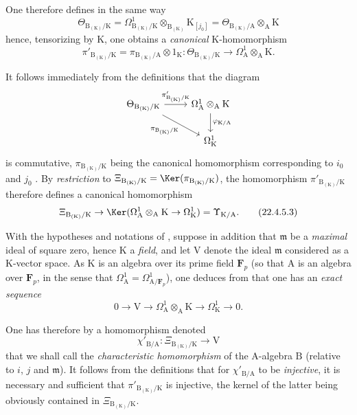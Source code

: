 \begin{env}[22.4.5]
One therefore defines in the same way
\[
  \Theta_{\mathrm{B}_{(\mathrm{K})}/\mathrm{K}}=\Omega^1_{\mathrm{B}_{(\mathrm{K})}/\mathrm{K}}\otimes_{\mathrm{B}_{(\mathrm{K})}}\mathrm{K}_{[j_0]}=\Theta_{\mathrm{B}_{(\mathrm{K})}/\mathrm{A}}\otimes_\mathrm{A}\mathrm{K}
\]
hence, tensorizing  by $\mathrm{K}$, one obtains a \emph{canonical} $\mathrm{K}$-homomorphism
\[
\label{0.22.4.5.2}
  \pi'_{\mathrm{B}_{(\mathrm{K})}/\mathrm{K}}=\pi_{\mathrm{B}_{(\mathrm{K})}/\mathrm{A}}\otimes 1_\mathrm{K}:\Theta_{\mathrm{B}_{(\mathrm{K})}/\mathrm{K}}\to\Omega^1_\mathrm{A}\otimes_\mathrm{A}\mathrm{K}.
  \tag{22.4.5.2}
\]

It follows immediately from the definitions that the diagram
\[
  \begin{tikzcd}
    \Theta_{\mathrm{B}_{(\mathrm{K})}/\mathrm{K}} \ar[r,"\pi'_{\mathrm{B}_{(\mathrm{K})}/\mathrm{K}}"] \ar[dr,"\pi_{\mathrm{B}_{(\mathrm{K})}/\mathrm{K}}",swap] & \Omega^1_\mathrm{A}\otimes_\mathrm{A}\mathrm{K} \ar[d,"\varphi_{\mathrm{K}/\mathrm{A}}"]\\
    & \Omega^1_\mathrm{K}
  \end{tikzcd}
\]
is commutative, $\pi_{\mathrm{B}_{(\mathrm{K})}/\mathrm{K}}$ being the canonical homomorphism corresponding to $i_0$ and $j_0$ .
By \emph{restriction} to $\Xi_{\mathrm{B}_{(\mathrm{K})}/\mathrm{K}}=\Ker(\pi_{\mathrm{B}_{(\mathrm{K})}/\mathrm{K}})$, the homomorphism $\pi'_{\mathrm{B}_{(\mathrm{K})}/\mathrm{K}}$ therefore defines a canonical homomorphism
\[
\label{0.22.4.5.3}
  \Xi_{\mathrm{B}_{(\mathrm{K})}/\mathrm{K}}\to\Ker(\Omega^1_\mathrm{A}\otimes_\mathrm{A}\mathrm{K}\to\Omega^1_\mathrm{K})=\Upsilon_{\mathrm{K}/\mathrm{A}}.
  \tag{22.4.5.3}
\]
\end{env}

\begin{env}[22.4.6]
\label{0.22.4.6}
With the hypotheses and notations of , suppose in addition that $\mathfrak{m}$ be a \emph{maximal} ideal of square zero, hence $\mathrm{K}$ a \emph{field}, and let $\mathrm{V}$ denote the ideal $\mathfrak{m}$ considered as a $\mathrm{K}$-vector space.
As $\mathrm{K}$ is an algebra over its prime field $\mathbf{F}_p$ (so that $\mathrm{A}$ is an algebra over $\mathbf{F}_p$, in the sense that $\Omega^1_\mathrm{A}=\Omega^1_{\mathrm{A}/\mathbf{F}_p}$), one deduces from  that one has an \emph{exact sequence}
\[
\label{0.22.4.6.1}
  0\to\mathrm{V}\to\Omega^1_\mathrm{A}\otimes_\mathrm{A}\mathrm{K}\to\Omega^1_\mathrm{K}\to 0.
  \tag{22.4.6.1}
\]

One has therefore by  a homomorphism denoted
\[
\label{0.22.4.6.2}
  \chi'_{\mathrm{B}/\mathrm{A}}:\Xi_{\mathrm{B}_{(\mathrm{K})}/\mathrm{K}}\to\mathrm{V}
  \tag{22.4.6.2}
\]
that we shall call the \emph{characteristic homomorphism} of the $\mathrm{A}$-algebra $\mathrm{B}$ (relative to $i$, $j$ and $\mathfrak{m}$).
It follows from the definitions that for $\chi'_{\mathrm{B}/\mathrm{A}}$ to be \emph{injective}, it is necessary and sufficient that $\pi'_{\mathrm{B}_{(\mathrm{K})}/\mathrm{K}}$ is injective, the kernel of the latter being obviously contained in $\Xi_{\mathrm{B}_{(\mathrm{K})}/\mathrm{K}}$.
\end{env}

